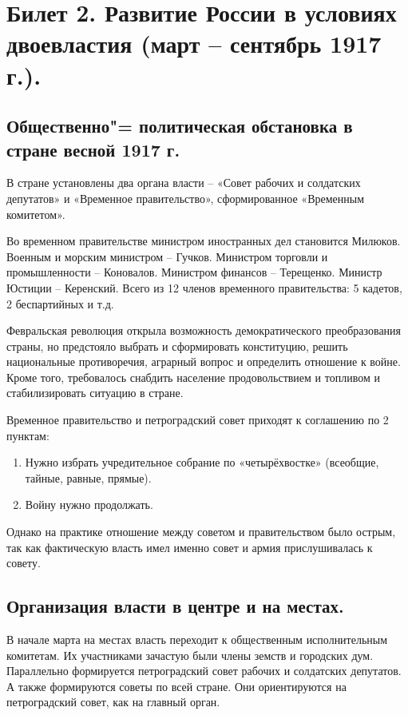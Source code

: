 \section{Билет 2. Развитие России в условиях двоевластия (март – сентябрь 1917 г.).}

\subsection{Общественно"= политическая обстановка в стране весной 1917 г.}

В стране установлены два органа власти – «Совет рабочих и солдатских депутатов» и «Временное правительство», сформированное «Временным комитетом».

Во временном правительстве министром иностранных дел становится Милюков. Военным и морским министром – Гучков. Министром торговли и промышленности – Коновалов. Министром финансов – Терещенко. Министр Юстиции – Керенский. Всего из 12 членов временного правительства: 5 кадетов, 2 беспартийных и т.д.

Февральская революция открыла возможность демократического преобразования страны, но предстояло выбрать и сформировать конституцию, решить национальные противоречия, аграрный вопрос и определить отношение к войне. Кроме того, требовалось снабдить население продовольствием и топливом и стабилизировать ситуацию в стране.

Временное правительство и петроградский совет приходят к соглашению по 2 пунктам:

\begin{enumerate}
    \item Нужно избрать учредительное собрание по «четырёхвостке» (всеобщие, тайные, равные, прямые).
    \item Войну нужно продолжать.
\end{enumerate}
Однако на практике отношение между советом и правительством было острым, так как фактическую власть имел именно совет и армия прислушивалась к совету.



\subsection{Организация власти в центре и на местах.}

В начале марта на местах власть переходит к общественным исполнительным комитетам. Их участниками зачастую были члены земств и городских дум. 
Параллельно формируется петроградский совет рабочих и солдатских депутатов. А также формируются советы по всей стране. Они ориентируются на петроградский совет, как на главный орган.


